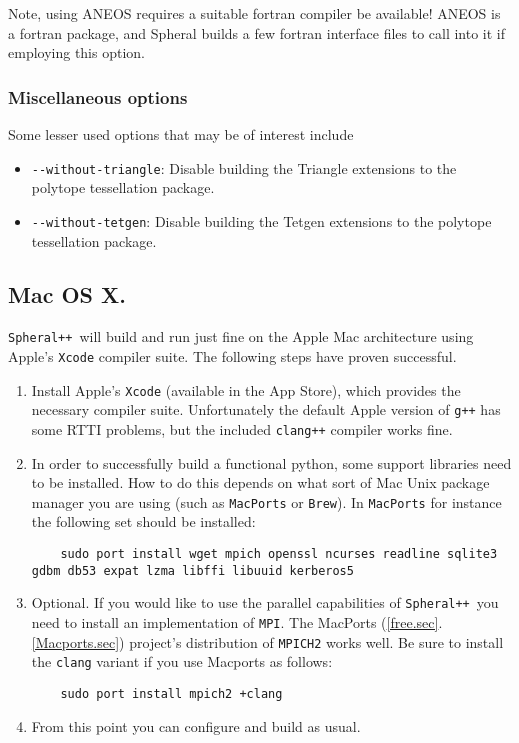 \documentclass{article}
\newcommand{\Spheral}{{\tt Spheral++}}
\begin{document}
Note, using ANEOS requires a suitable fortran compiler be available!  ANEOS is a fortran package, and Spheral builds a few fortran interface files to call into it if employing this option.

\subsubsection{Miscellaneous options}
Some lesser used options that may be of interest include
\begin{itemize}
\item \verb+--without-triangle+: Disable building the Triangle extensions to the polytope tessellation package.
\item \verb+--without-tetgen+: Disable building the Tetgen extensions to the polytope tessellation package.
\end{itemize}

\subsection{Mac OS X.}
\Spheral\ will build and run just fine on the Apple Mac architecture using Apple's \verb+Xcode+ compiler suite.  The following steps have proven successful.
\begin{enumerate}
\item Install Apple's \verb+Xcode+ (available in the App Store), which provides the necessary compiler suite.  Unfortunately the default Apple version of \verb.g++. has some RTTI problems, but the included \verb.clang++. compiler works fine.
\item In order to successfully build a functional python, some support libraries need to be installed.  How to do this depends on what sort of Mac Unix package manager you are using (such as \verb.MacPorts. or \verb.Brew.).  In \verb.MacPorts. for instance the following set should be installed:
\begin{verbatim}
    sudo port install wget mpich openssl ncurses readline sqlite3 gdbm db53 expat lzma libffi libuuid kerberos5
\end{verbatim}
\item Optional.  If you would like to use the parallel capabilities of \Spheral\ you need to install an implementation of \verb.MPI..  The MacPorts (\ref{free.sec}.\ref{Macports.sec}) project's distribution of \verb.MPICH2. works well.  Be sure to install the \verb.clang. variant if you use Macports as follows:
\begin{verbatim}
    sudo port install mpich2 +clang
\end{verbatim}
\item From this point you can configure and build as usual.
\end{enumerate}
\end{document}
